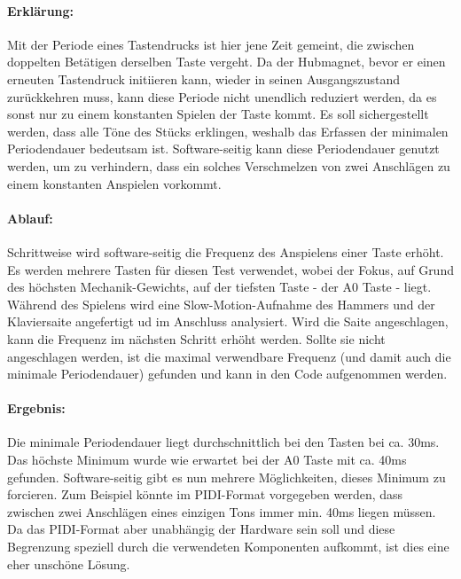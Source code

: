 \paragraph{Erklärung:}
Mit der Periode eines Tastendrucks ist hier jene Zeit gemeint, die zwischen doppelten Betätigen derselben Taste vergeht.
Da der Hubmagnet, bevor er einen erneuten Tastendruck initiieren kann, wieder in seinen Ausgangszustand zurückkehren muss, kann diese Periode nicht unendlich reduziert werden, da es sonst nur zu einem konstanten Spielen der Taste kommt.
Es soll sichergestellt werden, dass alle Töne des Stücks erklingen, weshalb das Erfassen der minimalen Periodendauer bedeutsam ist.
Software-seitig kann diese Periodendauer genutzt werden, um zu verhindern, dass ein solches \ac{Verschmelzen} von zwei Anschlägen zu einem konstanten Anspielen vorkommt.

\paragraph{Ablauf:}
Schrittweise wird software-seitig die Frequenz des Anspielens einer Taste erhöht.
Es werden mehrere Tasten für diesen Test verwendet, wobei der Fokus, auf Grund des höchsten Mechanik-Gewichts, auf der tiefsten Taste - der A0 Taste - liegt. %
Während des Spielens wird eine Slow-Motion-Aufnahme des Hammers und der Klaviersaite angefertigt ud im Anschluss analysiert.
Wird die Saite angeschlagen, kann die Frequenz im nächsten Schritt erhöht werden.
Sollte sie nicht angeschlagen werden, ist die maximal verwendbare Frequenz (und damit auch die minimale Periodendauer) gefunden und kann in den Code aufgenommen werden.

\paragraph{Ergebnis:}
Die minimale Periodendauer liegt durchschnittlich bei den Tasten bei ca. 30ms.
Das höchste Minimum wurde wie erwartet bei der A0 Taste mit ca. 40ms gefunden. \newline
Software-seitig gibt es nun mehrere Möglichkeiten, dieses Minimum zu forcieren.
Zum Beispiel könnte im \ac{PIDI}-Format vorgegeben werden, dass zwischen zwei Anschlägen eines einzigen Tons immer min. 40ms liegen müssen.
Da das \ac{PIDI}-Format aber unabhängig der Hardware sein soll und diese Begrenzung speziell durch die verwendeten Komponenten aufkommt, ist dies eine eher unschöne Lösung.

